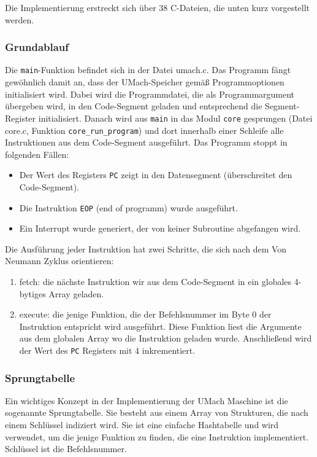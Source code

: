 Die Implementierung erstreckt sich über 38 C-Dateien, die unten kurz vorgestellt
werden.

\subsubsection{Grundablauf}
Die \texttt{main}-Funktion befindet sich in der Datei umach.c. Das Programm
fängt gewöhnlich damit an, dass der UMach-Speicher gemäß Programmoptionen
initialisiert wird. Dabei wird die Programmdatei, die als Programmargument
übergeben wird, in den Code-Segment geladen und entsprechend die
Segment-Register initialisiert. Danach wird aus \texttt{main} in das Modul
\texttt{core} gesprungen (Datei core.c, Funktion \texttt{core\_run\_program})
und dort innerhalb einer Schleife alle Instruktionen aus dem Code-Segment
ausgeführt. Das Programm stoppt in folgenden Fällen:
\begin{itemize}
  \item Der Wert des Registers \texttt{PC} zeigt in den Datensegment
(überschreitet den Code-Segment).
  \item Die Instruktion \texttt{EOP} (end of programm) wurde ausgeführt.
  \item Ein Interrupt wurde generiert, der von keiner Subroutine abgefangen
wird.
\end{itemize}


Die Ausführung jeder Instruktion hat zwei Schritte, die sich nach dem Von
Neumann Zyklus orientieren:
\begin{enumerate}
  \item fetch: die nächste Instruktion wir aus dem Code-Segment in ein globales
4-bytiges Array geladen. 
  \item execute: die jenige Funktion, die der Befehlsnummer im Byte 0 der
Instruktion entspricht wird ausgeführt. Diese Funktion liest die Argumente aus
dem globalen Array wo die Instruktion geladen wurde. Anschließend wird der Wert
des \texttt{PC} Registers mit 4 inkrementiert.
\end{enumerate}


\subsubsection{Sprungtabelle}

Ein wichtiges Konzept in der Implementierung der UMach Maschine ist die
sogenannte Sprungtabelle. Sie besteht aus einem Array von Strukturen, die nach
einem Schlüssel indiziert wird. Sie ist eine einfache Hashtabelle und wird
verwendet, um die jenige Funktion zu finden, die eine Instruktion
implementiert. Schlüssel ist die Befehlsnummer.

